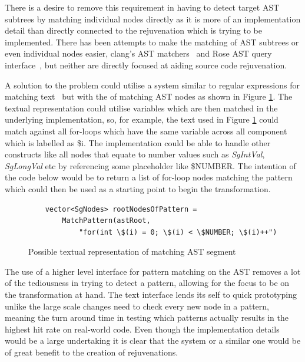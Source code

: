 \documentclass[bsc,frontabs,singlespacing,twoside,parskip,deptreport]{infthesis}
\begin{document}
There is a desire to remove this requirement in having to detect target AST subtrees by matching individual nodes directly as it is more of an implementation detail than directly connected to the rejuvenation which is trying to be implemented. There has been attempts to make the matching of AST subtrees or even individual nodes easier, clang's AST matchers~\cite{CLANG_MATCH_AST} and Rose AST query interface~\cite{ROSE_TUT_AST_QUERY}, but neither are directly focused at aiding source code rejuvenation. 

A solution to the problem could utilise a system similar to regular expressions for matching text~\cite{Aho:1992:FCS:114768} but with the of matching AST nodes as shown in  Figure \ref{fig:adv-ast-matching}. The textual representation could utilise variables which are then matched in the underlying implementation, so, for example, the text used in Figure \ref{fig:adv-ast-matching} could match against all for-loops which have the same variable across all component which is labelled as \$i. The implementation could be able to handle other constructs like all nodes that equate to number values such as \textit{SgIntVal}, \textit{SgLongVal} etc by referencing some placeholder like \$NUMBER. The intention of the code below would be to return a list of for-loop nodes matching the pattern which could then be used as a starting point to begin the transformation.

 \begin{figure}[H]
    \centering
    \begin{verbatim}
    vector<SgNodes> rootNodesOfPattern =
        MatchPattern(astRoot,
            "for(int \$(i) = 0; \$(i) < \$NUMBER; \$(i)++")
    \end{verbatim}
    \caption{Possible textual representation of matching AST segment}
    \label{fig:adv-ast-matching}
\end{figure}

The use of a higher level interface for pattern matching on the AST removes a lot of the tediousness in trying to detect a pattern, allowing for the focus to be on the transformation at hand. The text interface lends its self to quick prototyping unlike the large scale changes need to check every new node in a pattern, meaning the turn around time in testing which patterns actually results in the highest hit rate on real-world code. Even though the implementation details would be a large undertaking it is clear that the system or a similar one would be of great benefit to the creation of rejuvenations.
\end{document}
